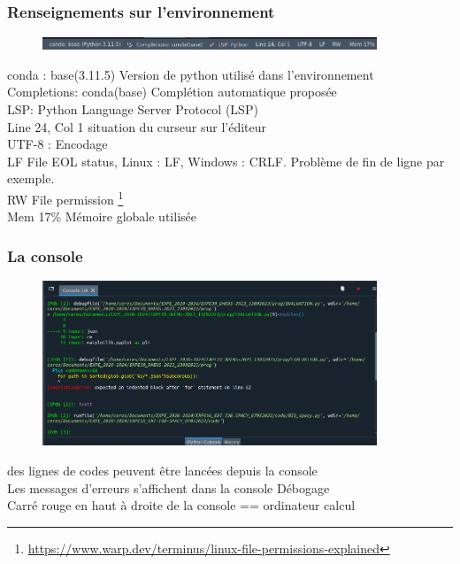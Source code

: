 \begin{frame}
  \frametitle{Renseignements sur l'environnement}
  \begin{figure}
  \includegraphics[width=10cm]{images/spyder_infos.png}
  \end{figure}
   conda : base(3.11.5)  Version de python utilisé dans l'environnement\\
   Completions: conda(base)  Complétion automatique proposée\\
   LSP: Python  Language Server Protocol (LSP) \\
   Line 24, Col 1  situation du curseur sur l'éditeur\\
  UTF-8 : Encodage\\
   LF  File EOL status, Linux : LF, Windows : CRLF. Problème de fin de ligne par exemple.\\
   RW  File permission \footnote{\url{https://www.warp.dev/terminus/linux-file-permissions-explained}}\\
  Mem 17\%  Mémoire globale utilisée
  
\end{frame}

\begin{frame}  \frametitle{La console}
  \begin{figure}
  \includegraphics[width=10cm]{images/spyder_console.png}
  \end{figure}
   des lignes de codes peuvent être lancées depuis la console\\
   Les messages d'erreurs s'affichent dans la console  Débogage\\
   Carré rouge en haut à droite de la console  == ordinateur calcul
\end{frame}

